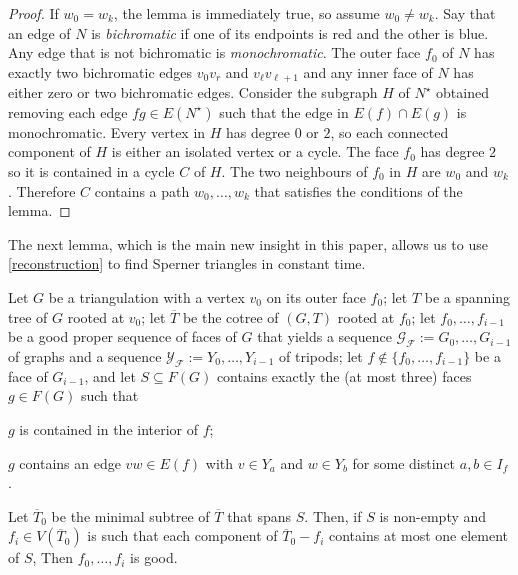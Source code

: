 \documentclass[a4paper,UKenglish,autoref]{lipics-v2021}
\begin{document}
\begin{proof}
  If $w_0=w_k$, the lemma is immediately true, so assume $w_0\neq w_k$.
  Say that an edge of $N$ is \emph{bichromatic} if one of its endpoints is red and the other is blue.  Any edge that is not bichromatic is \emph{monochromatic}.  The outer face $f_0$ of $N$ has exactly two bichromatic edges $v_0v_r$ and $v_{\ell}v_{\ell+1}$ and any inner face of $N$ has either zero or two bichromatic edges.  Consider the subgraph $H$ of $N^\star$ obtained removing each edge $fg\in E(N^\star)$ such that the edge in $E(f)\cap E(g)$ is monochromatic.  Every vertex in $H$ has degree $0$ or $2$, so each connected component of $H$ is either an isolated vertex or a cycle.  The face $f_0$ has degree $2$ so it is contained in a cycle $C$ of $H$.  The two neighbours of $f_0$ in $H$ are $w_0$ and $w_k$. Therefore $C$ contains a path $w_0,\ldots,w_k$ that satisfies the conditions of the lemma.
\end{proof}

The next lemma, which is the main new insight in this paper, allows us to use \cref{reconstruction} to find Sperner triangles in constant time.

\begin{lem}\label{lca_sperner}
  Let $G$ be a triangulation with a vertex $v_0$ on its outer face $f_0$; let $T$ be a spanning tree of $G$ rooted at $v_0$; let $\overline{T}$ be the cotree of $(G,T)$ rooted at $f_0$; let $f_0,\ldots,f_{i-1}$ be a good proper sequence of faces of $G$ that yields a sequence $\mathcal{G_F}:=G_0,\ldots,G_{i-1}$ of graphs and a sequence $\mathcal{Y_F}:=Y_0,\ldots,Y_{i-1}$ of tripods; let $f\not\in \{f_0,\ldots,f_{i-1}\}$ be a face of $G_{i-1}$, and let $S\subseteq F(G)$ contains exactly the (at most three) faces $g\in F(G)$ such that
  \begin{compactenum}[(i)]
      \item $g$ is contained in the interior of $f$;
      \item $g$ contains an edge $vw\in E(f)$ with $v\in Y_a$ and $w\in Y_b$ for some distinct $a,b\in I_f$.
  \end{compactenum}
  Let $\overline{T}_0$ be the minimal subtree of $\overline{T}$ that spans $S$.  Then, if $S$ is non-empty and $f_i\in V(\overline{T}_0)$ is such that each component of $\overline{T}_0-f_i$ contains at most one element of $S$,
  Then $f_0,\ldots,f_i$ is good.
\end{lem}
\end{document}
